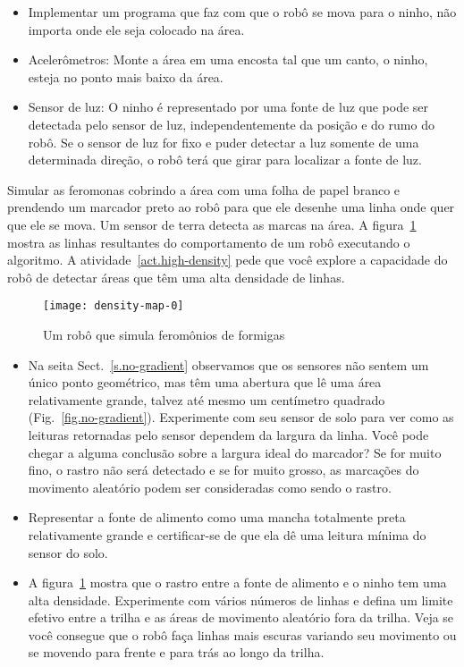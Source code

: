 \begin{framed}
\begin{itemize}
\item Implementar um programa que faz com que o robô se mova para o ninho, não importa onde ele seja colocado na área.
\item Acelerômetros: Monte a área em uma encosta tal que um canto, o ninho, esteja no ponto mais baixo da área. 
\item Sensor de luz: O ninho é representado por uma fonte de luz que pode ser detectada pelo sensor de luz, independentemente da posição e do rumo do robô. Se o sensor de luz for fixo e puder detectar a luz somente de uma determinada direção, o robô terá que girar para localizar a fonte de luz.
\end{itemize}
\end{framed}

Simular as feromonas cobrindo a área com uma folha de papel branco e prendendo um marcador preto ao robô para que ele desenhe uma linha onde quer que ele se mova. Um sensor de terra detecta as marcas na área. A figura~\ref{fig.ant-result} mostra as linhas resultantes do comportamento de um robô executando o algoritmo. A atividade~\ref{act.high-density} pede que você explore a capacidade do robô de detectar áreas que têm uma alta densidade de linhas.

\begin{figure}
\begin{center}
\texttt{[image: density-map-0]}
\end{center}
\caption{Um robô que simula feromônios de formigas}\label{fig.ant-result}
\end{figure}

\begin{framed}
\begin{itemize}
\item Na seita Sect.~\ref{s.no-gradient} observamos que os sensores não sentem um único ponto geométrico, mas têm uma abertura que lê uma área relativamente grande, talvez até mesmo um centímetro quadrado (Fig.~\ref{fig.no-gradient}). Experimente com seu sensor de solo para ver como as leituras retornadas pelo sensor dependem da largura da linha. Você pode chegar a alguma conclusão sobre a largura ideal do marcador? Se for muito fino, o rastro não será detectado e se for muito grosso, as marcações do movimento aleatório podem ser consideradas como sendo o rastro.
\item Representar a fonte de alimento como uma mancha totalmente preta relativamente grande e certificar-se de que ela dê uma leitura mínima do sensor do solo.
\item A figura~\ref{fig.ant-result} mostra que o rastro entre a fonte de alimento e o ninho tem uma alta densidade. Experimente com vários números de linhas e defina um limite efetivo entre a trilha e as áreas de movimento aleatório fora da trilha. Veja se você consegue que o robô faça linhas mais escuras variando seu movimento ou se movendo para frente e para trás ao longo da trilha.
\end{itemize}
\end{framed}

